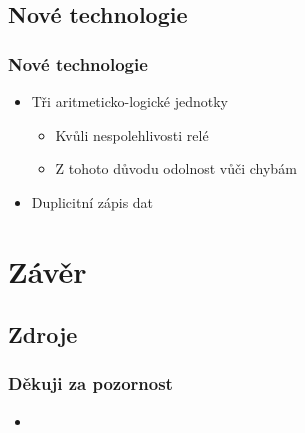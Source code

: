 \documentclass{beamer}
\begin{document}
\subsection{Nové technologie}
    \begin{frame}
        \frametitle{Nové technologie}
        \begin{itemize}
            \item Tři aritmeticko-logické jednotky
                \begin{itemize}
                    \item Kvůli nespolehlivosti relé
                    \item Z tohoto důvodu odolnost vůči chybám
                \end{itemize}
            \item Duplicitní zápis dat
        \end{itemize}
    \end{frame}
\section{Závěr}
\subsection{Zdroje}
    \begin{frame}
        \frametitle{Děkuji za pozornost}
        \begin{itemize}
            \item
        \end{itemize}
    \end{frame}
\end{document}
